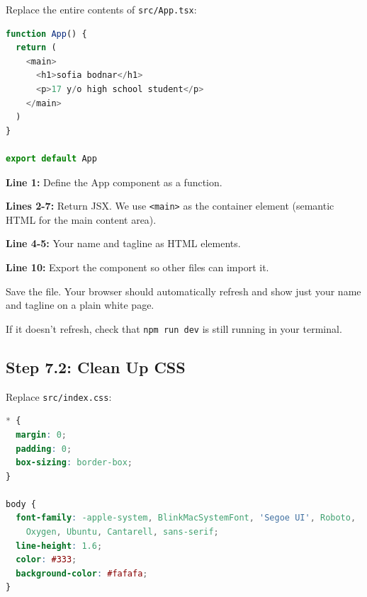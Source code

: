 \documentclass[12pt,a4paper]{article}
\begin{document}
Replace the entire contents of \texttt{src/App.tsx}:

\begin{lstlisting}[language=JavaScript,caption={src/App.tsx - Clean starting point}]
function App() {
  return (
    <main>
      <h1>sofia bodnar</h1>
      <p>17 y/o high school student</p>
    </main>
  )
}

export default App
\end{lstlisting}

\begin{explanation}
\textbf{Line 1:} Define the App component as a function.

\textbf{Lines 2-7:} Return JSX. We use \texttt{<main>} as the container element (semantic HTML for the main content area).

\textbf{Line 4-5:} Your name and tagline as HTML elements.

\textbf{Line 10:} Export the component so other files can import it.
\end{explanation}

\begin{checkpoint}
Save the file. Your browser should automatically refresh and show just your name and tagline on a plain white page.

If it doesn't refresh, check that \texttt{npm run dev} is still running in your terminal.
\end{checkpoint}

\subsection{Step 7.2: Clean Up CSS}

Replace \texttt{src/index.css}:

\begin{lstlisting}[language=CSS,caption={src/index.css - Clean global styles}]
* {
  margin: 0;
  padding: 0;
  box-sizing: border-box;
}

body {
  font-family: -apple-system, BlinkMacSystemFont, 'Segoe UI', Roboto,
    Oxygen, Ubuntu, Cantarell, sans-serif;
  line-height: 1.6;
  color: #333;
  background-color: #fafafa;
}
\end{lstlisting}
\end{document}
